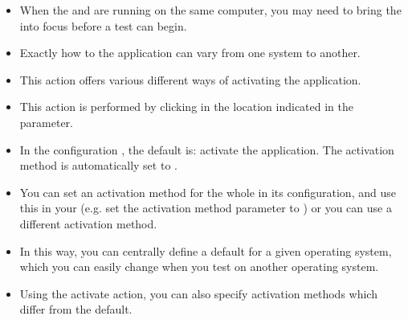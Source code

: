 \label{activate}
\begin{itemize}
\item When the \ite{} and \gdagent{} are running on the same computer, you may need to bring the \gdaut{} into focus before a test can begin.
\item Exactly how to  the application can vary from one system to another.
\item This action offers various different ways of activating the application.
\item This action is performed by clicking in the location indicated in the  parameter.
\item In the \gdaut{} configuration , the default is:
activate the application. The activation method is automatically set to .
\item You can set an activation method for the whole \gdaut{} in  its configuration, and use this in your \gdsteps{} (e.g. set the activation method parameter to ) or you can use a different activation method.
\item In this way, you can centrally define a default for a given operating system, which you can easily change when you test on another operating system.
\item Using the activate action, you can also specify activation methods which differ from the default.

 
\end{itemize}



  
